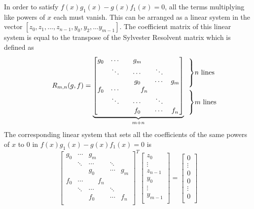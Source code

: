 In order to satisfy $f(x) g_1(x) - g(x) f_1(x) = 0$, all the terms multiplying like powers of $x$ each must vanish. This can be arranged as a linear system in the vector $[ z_0,z_1,..., z_{n-1},y_0,y_2,...y_{m-1}]$. The coefficient matrix of this linear system is equal to the transpose of the Sylvester Resolvent matrix which is defined as
\begin{align*}
R_{m,n}(g,f)=
\underbrace{
\begin{bmatrix}
g_0 & \cdots & g_m & & \\
&\ddots & \cdots & \ddots & \\
& & g_0 & \cdots & g_m \\
f_0 & \cdots & ~~~~~~f_n & & \\
&\ddots & \cdots & \ddots & \\
& &f_0 & \cdots &f_n \\
\end{bmatrix}
}_{m+n}
\begin{array}{l}
  \\[-8mm] \rdelim\}{3.7}{6mm}[$n$ lines] \\ \\ \\[4mm]  \rdelim\}{3}{6mm}[$m$ lines] \\ \\
\end{array} \\[-1ex]
\end{align*}

The corresponding linear system that sets all the coefficients of the same powers of $x$ to $0$ in $f(x) g_1(x) - g(x) f_1(x) = 0$ is 
\[
\begin{bmatrix}
g_0 & \cdots & g_m & & \\
&\ddots & \cdots & \ddots & \\
& & g_0 & \cdots & g_m \\
f_0 & \cdots &~~~~~~f_n & & \\
&\ddots & \cdots & \ddots & \\
& &f_0 & \cdots &f_n \\
\end{bmatrix}^T 
\begin{bmatrix}
z_0\\
\vdots\\
z_{n-1}\\
y_0\\
\vdots \\
y_{m-1}\\
\end{bmatrix} = 
\begin{bmatrix}
0\\
\vdots\\
0\\
0\\
\vdots\\
0\\
\end{bmatrix}
\]

